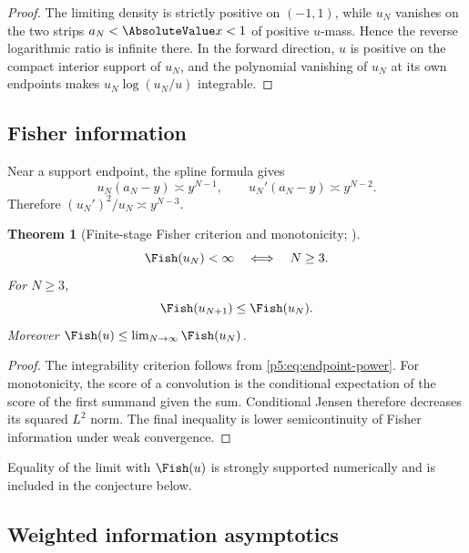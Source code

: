 \documentclass[11pt,oneside]{article}
\numberwithin{equation}{section}
\newtheorem{theorem}{Theorem}[section]
\theoremstyle{definition}
\theoremstyle{remark}
\begin{document}
\begin{proof}
The limiting density is strictly positive on $(-1,1)$, while $u_N$ vanishes on the two strips $a_N<\AbsoluteValue x<1$ of positive $u$-mass.  Hence the reverse logarithmic ratio is infinite there.  In the forward direction, $u$ is positive on the compact interior support of $u_N$, and the polynomial vanishing of $u_N$ at its own endpoints makes $u_N\log(u_N/u)$ integrable.
\end{proof}

\subsection{Fisher information}

Near a support endpoint, the spline formula gives
\begin{equation}
 u_N(a_N-y)\asymp y^{N-1},
 \qquad
 u_N'(a_N-y)\asymp y^{N-2}.
 \label{p5:eq:endpoint-power}
\end{equation}
Therefore $(u_N')^2/u_N\asymp y^{N-3}$.

\begin{theorem}[Finite-stage Fisher criterion and monotonicity; \newresult]
\begin{equation}
 \Fish(u_N)<\infty\quad\Longleftrightarrow\quad N\ge3.
 \label{p5:eq:fisher-criterion}
\end{equation}
For $N\ge3$,
\begin{equation}
 \Fish(u_{N+1})\le\Fish(u_N).
 \label{p5:eq:fisher-monotone}
\end{equation}
Moreover $\Fish(u)\le\lim_{N\to\infty}\Fish(u_N)$.
\end{theorem}

\begin{proof}
The integrability criterion follows from \eqref{p5:eq:endpoint-power}.  For monotonicity, the score of a convolution is the conditional expectation of the score of the first summand given the sum.  Conditional Jensen therefore decreases its squared $L^2$ norm.  The final inequality is lower semicontinuity of Fisher information under weak convergence.
\end{proof}

Equality of the limit with $\Fish(u)$ is strongly supported numerically and is included in the conjecture below.

\subsection{Weighted information asymptotics}
\end{document}
